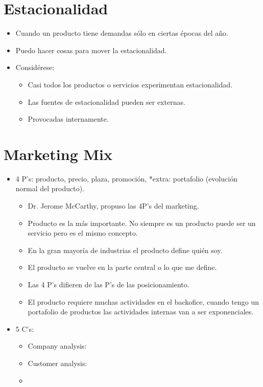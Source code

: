 \section{Estacionalidad}
\begin{itemize}
    \item Cuando un producto tiene demandas sólo en ciertas épocas del año.
    \item Puedo hacer cosas para mover la estacionalidad.
    \item Considérese:
        \begin{itemize}
            \item Casi todos los productos o servicios experimentan estacionalidad.
            \item Las fuentes de estacionalidad pueden ser externas.
            \item Provocadas internamente.  
        \end{itemize}
\end{itemize}


\section{Marketing Mix}
\begin{itemize}
    \item 4 P's: producto, precio, plaza, promoción, *extra: portafolio (evolución normal del producto).
        \begin{itemize}
            \item Dr. Jerome McCarthy, propuso las 4P's del marketing.
            \item Producto es la más importante. No siempre es un producto puede ser un servicio pero es el mismo concepto.
            \item En la gran mayoría de industrias el producto define quién soy.
            \item El producto se vuelve en la parte central o lo que me define.
            \item Las 4 P's difieren de las P's de las posicionamiento.
            \item El producto requiere muchas actividades en el backofice, cuando tengo un portafolio de productos las actividades internas van a ser exponenciales.
        \end{itemize}

    \item 5 C's: 
        \begin{itemize}
            \item Company analysis: 
            \item Customer analysis: 
            \item 
        \end{itemize}
\end{itemize}
